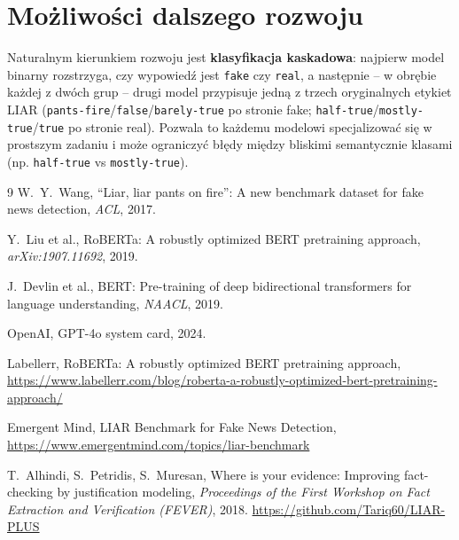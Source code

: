 \documentclass[11pt,a4paper]{article}
\begin{document}
\section{Możliwości dalszego rozwoju}

Naturalnym kierunkiem rozwoju jest \textbf{klasyfikacja kaskadowa}:
najpierw model binarny rozstrzyga, czy wypowiedź jest \texttt{fake} czy
\texttt{real}, a następnie -- w obrębie każdej z dwóch grup -- drugi
model przypisuje jedną z trzech oryginalnych etykiet LIAR
(\texttt{pants-fire}/\texttt{false}/\texttt{barely-true} po stronie fake;
\texttt{half-true}/\texttt{mostly-true}/\texttt{true} po stronie real).
Pozwala to każdemu modelowi specjalizować się w prostszym zadaniu i
może ograniczyć błędy między bliskimi semantycznie klasami
(np. \texttt{half-true} vs \texttt{mostly-true}).

\begin{thebibliography}{9}
  W.\ Y.\ Wang, ``Liar, liar pants on fire'': A new benchmark dataset for fake
  news detection, \emph{ACL}, 2017.

  Y.\ Liu et al., RoBERTa: A robustly optimized BERT pretraining approach,
  \emph{arXiv:1907.11692}, 2019.

  J.\ Devlin et al., BERT: Pre-training of deep bidirectional transformers
  for language understanding, \emph{NAACL}, 2019.

  OpenAI, GPT-4o system card, 2024.

  Labellerr, RoBERTa: A robustly optimized BERT pretraining approach,
  \url{https://www.labellerr.com/blog/roberta-a-robustly-optimized-bert-pretraining-approach/}

  Emergent Mind, LIAR Benchmark for Fake News Detection,
  \url{https://www.emergentmind.com/topics/liar-benchmark}

  T.\ Alhindi, S.\ Petridis, S.\ Muresan, Where is your evidence:
  Improving fact-checking by justification modeling, \emph{Proceedings of
  the First Workshop on Fact Extraction and Verification (FEVER)}, 2018.
  \url{https://github.com/Tariq60/LIAR-PLUS}
\end{thebibliography}
\end{document}
